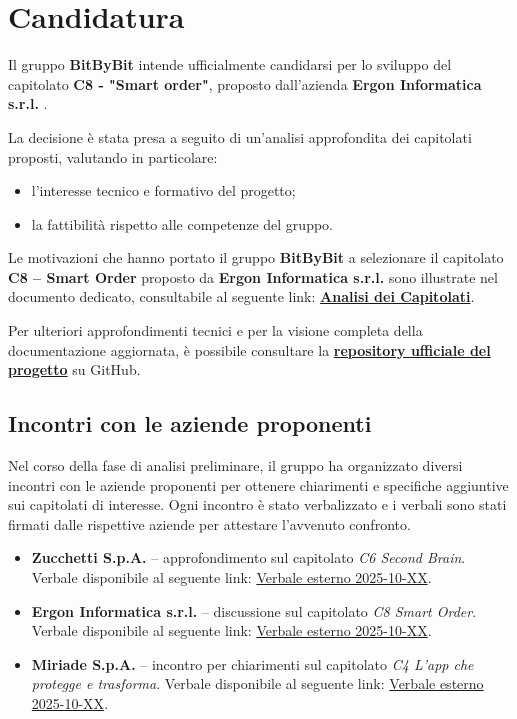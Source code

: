 \documentclass[a4paper,12pt]{article}
\begin{document}
\section{Candidatura}
Il gruppo \textbf{BitByBit} intende ufficialmente candidarsi per lo sviluppo del capitolato \textbf{C8 - "Smart order"}, proposto dall’azienda \textbf{Ergon Informatica s.r.l.} .

La decisione è stata presa a seguito di un’analisi approfondita dei capitolati proposti, valutando in particolare:
\begin{itemize}
    \item l’interesse tecnico e formativo del progetto;
    \item la fattibilità rispetto alle competenze del gruppo.
\end{itemize}


Le motivazioni che hanno portato il gruppo \textbf{BitByBit} a selezionare il capitolato \textbf{C8 – Smart Order} proposto da \textbf{Ergon Informatica s.r.l.} sono illustrate nel documento dedicato, consultabile al seguente link:  
\href{<LINK_ANALISI_CAPITOLATI>}{\textbf{Analisi dei Capitolati}}.

Per ulteriori approfondimenti tecnici e per la visione completa della documentazione aggiornata, è possibile consultare la \href{<LINK_REPOSITORY>}{\textbf{repository ufficiale del progetto}} su GitHub.

\subsection{Incontri con le aziende proponenti}

Nel corso della fase di analisi preliminare, il gruppo ha organizzato diversi incontri con le aziende proponenti per ottenere chiarimenti e specifiche aggiuntive sui capitolati di interesse.  
Ogni incontro è stato verbalizzato e i verbali sono stati firmati dalle rispettive aziende per attestare l’avvenuto confronto.

\begin{itemize}
    \item \textbf{Zucchetti S.p.A.} – approfondimento sul capitolato \emph{C6 Second Brain}.  
    Verbale disponibile al seguente link: \href{<LINK_VERBALE_ZUCCHETTI>}{Verbale esterno 2025-10-XX}.
    \item \textbf{Ergon Informatica s.r.l.} – discussione sul capitolato \emph{C8 Smart Order}.  
    Verbale disponibile al seguente link: \href{<LINK_VERBALE_ERGON>}{Verbale esterno 2025-10-XX}.
    \item \textbf{Miriade S.p.A.} – incontro per chiarimenti sul capitolato \emph{C4 L’app che protegge e trasforma}.  
    Verbale disponibile al seguente link: \href{<LINK_VERBALE_MIRIADE>}{Verbale esterno 2025-10-XX}.
\end{itemize}
\end{document}
